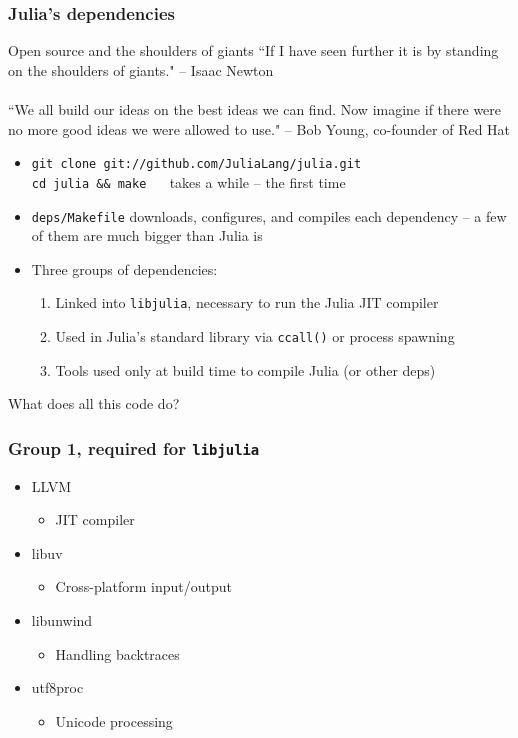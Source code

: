 \documentclass[compressed,dvips,letter]{beamer}
\begin{document}
\begin{frame}\frametitle{Julia's dependencies}

\begin{block}{Open source and the shoulders of giants}
\footnotesize
``If I have seen further it is by standing on the shoulders of giants." -- Isaac Newton
~ \\
~ \\
``We all build our ideas on the best ideas we can find. Now imagine if there were no more good ideas we were allowed to use." -- Bob Young, co-founder of Red Hat
\end{block}

\begin{itemize}
\item \texttt{git clone git://github.com/JuliaLang/julia.git \\ cd julia \&\& make} ~~ takes a while -- the first time
\item \texttt{deps/Makefile} downloads, configures, and compiles each dependency -- a few of them are much bigger than Julia is
\item Three groups of dependencies:
\begin{enumerate}
\item Linked into \texttt{libjulia}, necessary to run the Julia JIT compiler
\item Used in Julia's standard library via \texttt{ccall()} or process spawning
\item Tools used only at build time to compile Julia (or other deps)
\end{enumerate}

\end{itemize}

What does all this code do?
\end{frame}

%
%

\begin{frame}\frametitle{Group 1, required for \texttt{libjulia}}
\begin{itemize}
\item LLVM
\begin{itemize}
\item JIT compiler
\end{itemize}
\item libuv
\begin{itemize}
\item Cross-platform input/output
\end{itemize}
\item libunwind
\begin{itemize}
\item Handling backtraces
\end{itemize}
\item utf8proc
\begin{itemize}
\item Unicode processing
\end{itemize}
\end{itemize}
\end{frame}
\end{document}
